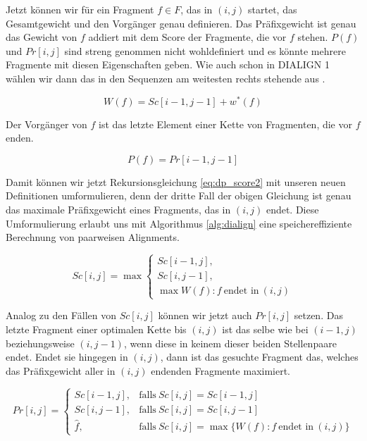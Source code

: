 Jetzt können wir für ein Fragment $f \in F$, das in $(i,j)$ startet, das Gesamtgewicht und den Vorgänger genau definieren. Das Präfixgewicht ist genau das Gewicht von $f$ addiert mit dem Score der Fragmente, die vor $f$ stehen. $P(f)$ und $Pr[i,j]$ sind streng genommen nicht wohldefiniert und es könnte mehrere Fragmente mit diesen Eigenschaften geben. Wie auch schon in DIALIGN 1 wählen wir dann das in den Sequenzen am weitesten rechts stehende aus \cite{mdw96}.

\begin{equation}\label{eq:praefixgewicht2}
	W(f) = Sc[i\!-\!1,j\!-\!1]+w^*(f)
\end{equation}

Der Vorgänger von $f$ ist das letzte Element einer Kette von Fragmenten, die vor $f$ enden.

\begin{equation}\label{eq:vorgaenger}
	P(f) = Pr[i\!-\!1,j\!-\!1]
\end{equation}

Damit können wir jetzt Rekursionsgleichung \eqref{eq:dp_score2} mit unseren neuen Definitionen umformulieren, denn der dritte Fall der obigen Gleichung ist genau das maximale Präfixgewicht eines Fragments, das in $(i,j)$ endet. Diese Umformulierung erlaubt uns mit Algorithmus \ref{alg:dialign} eine speichereffiziente Berechnung von paarweisen Alignments.

\begin{equation}\label{eq:praefixgewicht3}
	Sc[i,j] = \max
		\begin{cases}
		Sc[i\!-\!1,j], \\
		Sc[i,j\!-\!1], \\
		\max{W(f): f\: \text{endet in}\: (i,j)}
	\end{cases}	
\end{equation}

Analog zu den Fällen von $Sc[i,j]$ können wir jetzt auch $Pr[i,j]$ setzen. Das letzte Fragment einer optimalen Kette bis $(i,j)$ ist das selbe wie bei $(i-1,j)$ beziehungsweise $(i,j-1)$, wenn diese in keinem dieser beiden Stellenpaare endet. Endet sie hingegen in $(i,j)$, dann ist das gesuchte Fragment das, welches das Präfixgewicht aller in $(i,j)$ endenden Fragmente maximiert.

\begin{equation}\label{eq:vorgaenger2}
	Pr[i,j] =
		\begin{cases}
			Sc[i-1,j], & \text{falls}\: Sc[i,j] = Sc[i\!-\!1,j]\\
			Sc[i,j-1], & \text{falls}\: Sc[i,j] = Sc[i,j\!-\!1]\\
			\hat{f},   & \text{falls}\: Sc[i,j] = \max{\{W(f) : f\: \text{endet in}\: (i,j)\}}
		\end{cases}	
\end{equation}

